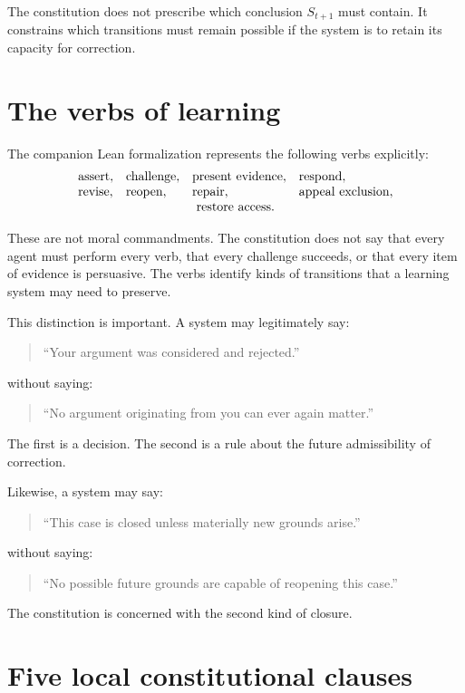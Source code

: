 \documentclass[11pt,a4paper]{article}
\begin{document}
The constitution does not prescribe which conclusion $S_{t+1}$ must contain. It constrains which transitions must remain possible if the system is to retain its capacity for correction.

\section{The verbs of learning}

The companion Lean formalization represents the following verbs explicitly:
\[
\begin{array}{llll}
\text{assert}, & \text{challenge}, & \text{present evidence}, & \text{respond},\\
\text{revise}, & \text{reopen}, & \text{repair}, & \text{appeal exclusion},\\
\multicolumn{4}{c}{\text{restore access}.}
\end{array}
\]

These are not moral commandments. The constitution does not say that every agent must perform every verb, that every challenge succeeds, or that every item of evidence is persuasive. The verbs identify kinds of transitions that a learning system may need to preserve.

This distinction is important. A system may legitimately say:
\begin{quote}
``Your argument was considered and rejected.''
\end{quote}
without saying:
\begin{quote}
``No argument originating from you can ever again matter.''
\end{quote}

The first is a decision. The second is a rule about the future admissibility of correction.

Likewise, a system may say:
\begin{quote}
``This case is closed unless materially new grounds arise.''
\end{quote}
without saying:
\begin{quote}
``No possible future grounds are capable of reopening this case.''
\end{quote}

The constitution is concerned with the second kind of closure.

\section{Five local constitutional clauses}
\end{document}
